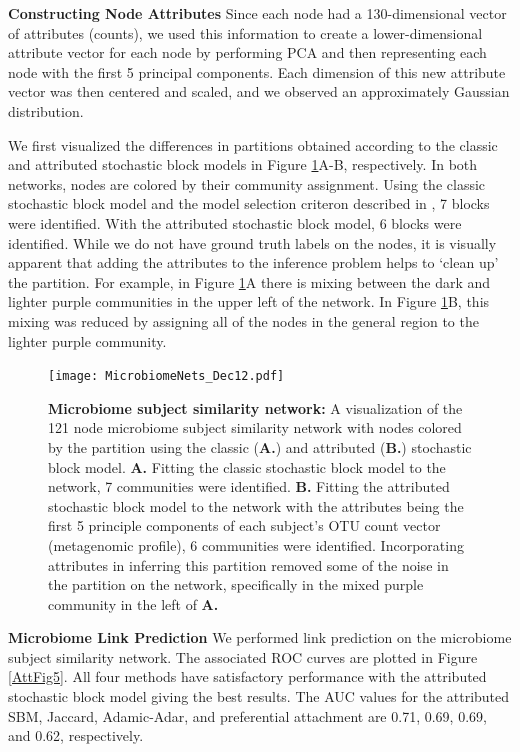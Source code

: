 {\bf Constructing Node Attributes}
Since each node had a 130-dimensional vector of attributes (counts), we used this information to create a lower-dimensional attribute vector for each node by performing PCA and then representing each node with the first 5 principal components. Each dimension of this new attribute vector was then centered and scaled, and we observed an approximately Gaussian distribution. 

We first visualized the differences in partitions obtained according to the classic and attributed stochastic block models in Figure \ref{AttFig4}A-B, respectively. In both networks, nodes are colored by their community assignment. Using the classic stochastic block model and the model selection criteron described in \cite{dudin}, 7 blocks were identified. With the attributed stochastic block model, 6 blocks were identified. While we do not have ground truth labels on the nodes, it is visually apparent that adding the attributes to the inference problem helps to `clean up' the partition. For example, in Figure \ref{AttFig4}A there is mixing between the dark and lighter purple communities in the upper left of the network. In Figure \ref{AttFig4}B, this mixing was reduced by assigning all of the nodes in the general region to the lighter purple community. 

\begin{figure}[h!]
\begin{center}
\texttt{[image: MicrobiomeNets\_Dec12.pdf]}
\caption{{\bf Microbiome subject similarity network:} A visualization of the 121 node microbiome subject similarity network with nodes colored by the partition using the classic ({\bf A.}) and attributed ({\bf B.}) stochastic block model. {\bf A.} Fitting the classic stochastic block model to the network, 7 communities were identified. {\bf B.} Fitting the attributed stochastic block model to the network with the attributes being the first 5 principle components of each subject's OTU count vector (metagenomic profile), 6 communities were identified. Incorporating attributes in inferring this partition removed some of the noise in the partition on the network, specifically in the mixed purple community in the left of {\bf A.}}
\label{AttFig4}
\end{center}
\end{figure}

{\bf Microbiome Link Prediction}
We performed link prediction on the microbiome subject similarity network. The associated ROC curves are plotted in Figure \ref{AttFig5}. All four methods have satisfactory performance with the attributed stochastic block model giving the best results. The AUC values for the attributed SBM, Jaccard, Adamic-Adar, and preferential attachment are 0.71, 0.69, 0.69, and 0.62, respectively. 
 
